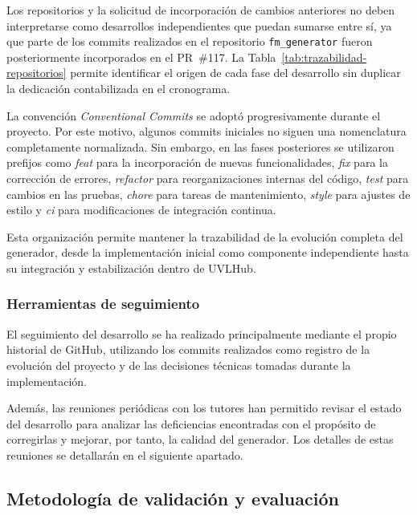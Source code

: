 Los repositorios y la solicitud de incorporación de cambios anteriores no
deben interpretarse como desarrollos independientes que puedan sumarse entre
sí, ya que parte de los commits realizados en el repositorio
\texttt{fm\_generator} fueron posteriormente incorporados en el PR~\#117.
La Tabla~\ref{tab:trazabilidad-repositorios} permite identificar el origen de
cada fase del desarrollo sin duplicar la dedicación contabilizada en el
cronograma.

La convención \textit{Conventional Commits} \cite{conventionalcommits} se adoptó progresivamente durante
el proyecto. Por este motivo, algunos commits iniciales no siguen una
nomenclatura completamente normalizada. Sin embargo, en las fases posteriores
se utilizaron prefijos como \textit{feat} para la incorporación de nuevas
funcionalidades, \textit{fix} para la corrección de errores, \textit{refactor}
para reorganizaciones internas del código, \textit{test} para cambios en las
pruebas, \textit{chore} para tareas de mantenimiento, \textit{style} para
ajustes de estilo y \textit{ci} para modificaciones de integración continua.

Esta organización permite mantener la trazabilidad de la evolución completa
del generador, desde la implementación inicial como componente independiente
hasta su integración y estabilización dentro de UVLHub.

\subsubsection*{Herramientas de seguimiento}

El seguimiento del desarrollo se ha realizado principalmente mediante el propio historial de GitHub, utilizando los commits realizados como registro de la evolución del proyecto y de las decisiones técnicas tomadas durante la implementación.

Además, las reuniones periódicas con los tutores han permitido revisar el estado del desarrollo para analizar las deficiencias encontradas con el propósito de corregirlas y mejorar, por tanto, la calidad del generador. Los detalles de estas reuniones se detallarán en el siguiente apartado.


\subsection{Metodología de validación y evaluación}
\label{sec:metodologia_validacion}



